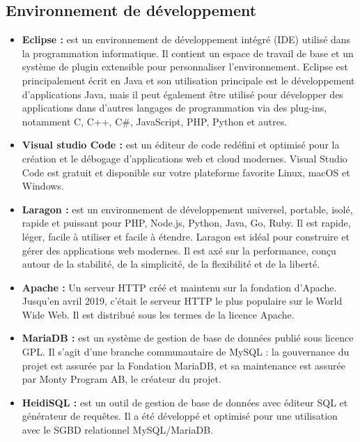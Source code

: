 \subsection[Environnement de développement]{Environnement de développement}
\begin{itemize}
	\item \textbf{Eclipse \cite{eclipse} :} est un environnement de développement intégré (IDE) utilisé dans la programmation informatique. Il contient un espace de travail de base et un système de plugin extensible pour personnaliser l'environnement. Eclipse est principalement écrit en Java et son utilisation principale est le développement d'applications Java, mais il peut également être utilisé pour développer des applications dans d'autres langages de programmation via des plug-ins, notamment C, C++, C\#, JavaScript, PHP, Python et autres.

	\item \textbf{Visual studio Code \cite{vscode} :} est un éditeur de code redéfini et optimisé pour la création et le débogage d'applications web et cloud modernes. Visual Studio Code est gratuit et disponible sur votre plateforme favorite Linux, macOS et Windows.

	\item \textbf{Laragon \cite{laragon} :} est un environnement de développement universel, portable, isolé, rapide et puissant pour PHP, Node.js, Python, Java, Go, Ruby. Il est rapide, léger, facile à utiliser et facile à étendre. Laragon est idéal pour construire et gérer des applications web modernes. Il est axé sur la performance, conçu autour de la stabilité, de la simplicité, de la flexibilité et de la liberté.

	\item \textbf{Apache \cite{apache} :} Un serveur HTTP créé et maintenu sur la fondation d'Apache. Jusqu'en avril 2019, c'était le serveur HTTP le plus populaire sur le World Wide Web. Il est distribué sous les termes de la licence Apache.
	
	\item \textbf{MariaDB \cite{mariadb} :} est un système de gestion de base de données publié sous licence GPL. Il s'agit d'une branche communautaire de MySQL : la gouvernance du projet est assurée par la Fondation MariaDB, et sa maintenance est assurée par Monty Program AB, le créateur du projet.
	
	\item \textbf{HeidiSQL \cite{heidisql} :} est un outil de gestion de base de données avec éditeur SQL et générateur de requêtes. Il a été développé et optimisé pour une utilisation avec le SGBD relationnel MySQL/MariaDB.
\end{itemize}


